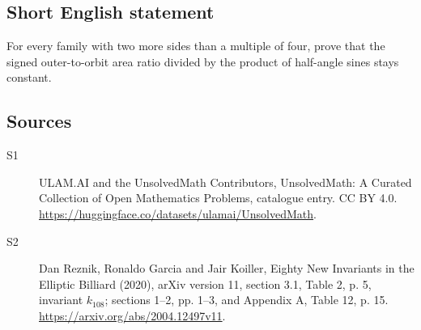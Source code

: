 \documentclass[11pt]{article}
\begin{document}
\subsection{Short English statement}
For every family with two more sides than a multiple of four, prove that the signed outer-to-orbit area ratio divided by the product of half-angle sines stays constant.
\subsection{Sources}
\begin{description}
\item[\hypertarget{source:statement:1}{S1}] ULAM.AI and the UnsolvedMath Contributors, UnsolvedMath: A Curated Collection of Open Mathematics Problems, catalogue entry. CC BY 4.0. \url{https://huggingface.co/datasets/ulamai/UnsolvedMath}.
\item[\hypertarget{source:statement:2}{S2}] Dan Reznik, Ronaldo Garcia and Jair Koiller, Eighty New Invariants in the Elliptic Billiard (2020), arXiv version 11, section 3.1, Table 2, p. 5, invariant $k_{108}$; sections 1--2, pp. 1--3, and Appendix A, Table 12, p. 15. \url{https://arxiv.org/abs/2004.12497v11}.
\end{description}
\label{end:statement}
\end{document}
